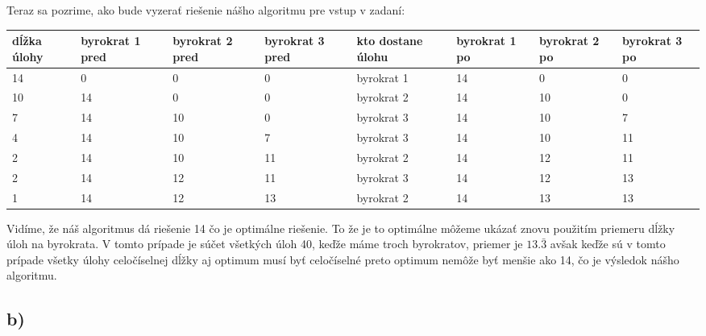 \documentclass[a4paper]{article}
\begin{document}
Teraz sa pozrime, ako bude vyzerať riešenie nášho algoritmu pre vstup v zadaní:
\begin{table}[!h]
	\begin{tabular}{|p{}|p{}|p{}|p{}|p{}|p{}|p{}|p{}|}
		\hline
		dĺžka úlohy & byrokrat 1 pred & byrokrat 2 pred & byrokrat 3 pred & kto dostane úlohu & byrokrat 1 po & byrokrat 2 po & byrokrat 3 po \\ \hline
		14          & 0               & 0               & 0               & byrokrat 1        & 14            & 0             & 0             \\ \hline
		10          & 14              & 0               & 0               & byrokrat 2        & 14            & 10            & 0             \\ \hline
		7           & 14              & 10              & 0               & byrokrat 3        & 14            & 10            & 7             \\ \hline
		4           & 14              & 10              & 7               & byrokrat 3        & 14            & 10            & 11            \\ \hline
		2           & 14              & 10              & 11              & byrokrat 2        & 14            & 12            & 11            \\ \hline
		2           & 14              & 12              & 11              & byrokrat 3        & 14            & 12            & 13            \\ \hline
		1           & 14              & 12              & 13              & byrokrat 2        & 14            & 13            & 13            \\ \hline
	\end{tabular}
\end{table}

Vidíme, že náš algoritmus dá riešenie 14 čo je optimálne riešenie. To že je to optimálne môžeme ukázať znovu použitím priemeru dĺžky úloh na byrokrata. V tomto prípade je súčet všetkých úloh 40, keďže máme troch byrokratov, priemer je $13.\bar{3}$ avšak keďže sú v tomto prípade všetky úlohy celočíselnej dĺžky aj optimum musí byť celočíselné preto optimum nemôže byť menšie ako 14, čo je výsledok nášho algoritmu. 

\subsection*{b)}
\end{document}
